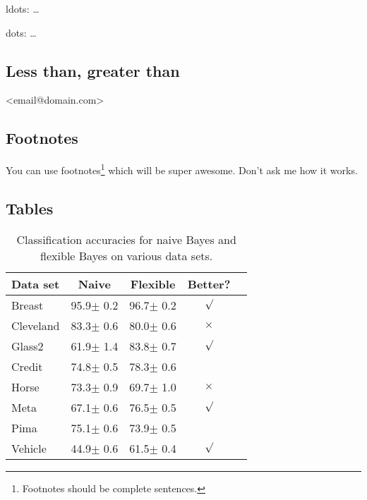 \documentclass{article}
\begin{document}
ldots: \ldots

dots: \dots

\subsection{Less than, greater than}

\textless{}email@domain.com\textgreater{}

\subsection{Footnotes}

You can use footnotes\footnote{Footnotes should be complete
  sentences.} which will be super awesome. Don't ask me how it works.

\subsection{Tables}

\begin{table}[t]
  \caption{Classification accuracies for naive Bayes and flexible
    Bayes on various data sets.}
  \label{sample-table}
  \begin{center}
    \begin{small}
      \begin{sc}
        \begin{tabular}{lcccr}
          \toprule
          Data set & Naive & Flexible & Better? \\
          \midrule
          Breast    & 95.9$\pm$ 0.2& 96.7$\pm$ 0.2& $\surd$ \\
          Cleveland & 83.3$\pm$ 0.6& 80.0$\pm$ 0.6& $\times$\\
          Glass2    & 61.9$\pm$ 1.4& 83.8$\pm$ 0.7& $\surd$ \\
          Credit    & 74.8$\pm$ 0.5& 78.3$\pm$ 0.6&         \\
          Horse     & 73.3$\pm$ 0.9& 69.7$\pm$ 1.0& $\times$\\
          Meta      & 67.1$\pm$ 0.6& 76.5$\pm$ 0.5& $\surd$ \\
          Pima      & 75.1$\pm$ 0.6& 73.9$\pm$ 0.5&         \\
          Vehicle   & 44.9$\pm$ 0.6& 61.5$\pm$ 0.4& $\surd$ \\
          \bottomrule
        \end{tabular}
      \end{sc}
    \end{small}
  \end{center}
  \vskip -0.1in
\end{table}
\end{document}
